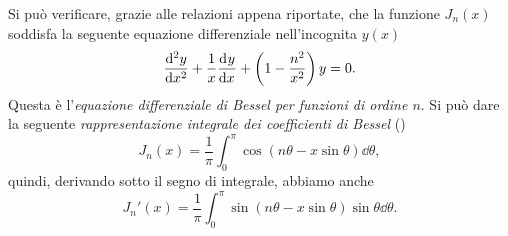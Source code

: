 Si può verificare, grazie alle relazioni appena riportate, che la funzione
$J_n(x)$ soddisfa la seguente equazione differenziale nell'incognita $y(x)$
\begin{equation}
  \toder[2]{y}{x} + \frac{1}{x}\toder{y}{x} +
  \left(
    1 - \frac{n^2}{x^2}
  \right)y = 0.
\end{equation}
Questa è l'\emph{equazione differenziale di Bessel per funzioni di ordine
  $n$}. Si può dare la seguente \emph{rappresentazione integrale dei
  coefficienti di Bessel}
(\textcites[20]{watson:bessel}[362]{whittaker:modern-analysis})
\begin{equation}
  \label{eq:bessel-integrale}
  J_n(x) = \frac{1}{\pi} \int_0^\pi\cos(n\theta - x\sin\theta)\dd\theta,
\end{equation}
quindi, derivando sotto il segno di integrale, abbiamo anche
\begin{equation}
  \label{eq:bessel-derivata-integrale}
  J_n'(x) = \frac{1}{\pi}\int_0^\pi\sin(n\theta - x\sin\theta)
  \sin\theta\dd\theta.
\end{equation}

